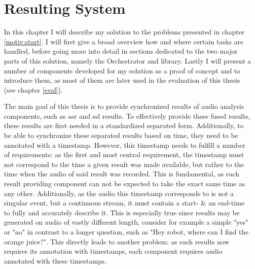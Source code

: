 \chapter{Resulting System}
\label{main:main}
In this chapter I will describe my solution to the problems presented in chapter \ref{motiv:start}.
I will first give a broad overview how and where certain tasks are handled, before going more into detail in sections dedicated to the two major parts of this solution, namely the Orchestrator and library.
Lastly I will present a number of components developed for my solution as a proof of concept and to introduce them, as most of them are later used in the evaluation of this thesis (see chapter \ref{eval}).

The main goal of this thesis is to provide synchronized results of audio analysis components, such as \gls{asr} and \gls{ssl} results.
To effectively provide these fused results, these results are first needed in a standardized separated form.
Additionally, to be able to synchronize these separated results based on time, they need to be annotated with a timestamp.
However, this timestamp needs to fulfill a number of requirements:
as the first and most central requirement, the timestamp must not correspond to the time a given result was made available, but rather to the time when the audio of said result was recorded.
This is fundamental, as each result providing component can not be expected to take the exact same time as any other.
Additionally, as the audio this timestamp corresponds to is not a singular event, but a continuous stream, it must contain a start- \& an end-time to fully and accurately describe it.
This is especially true since results may be generated on audio of vastly different length, consider for example a simple "yes" or "no" in contrast to a longer question, such as "Hey robot, where can I find the orange juice?".
This directly leads to another problem:
as each results now requires its annotation with timestamps, each component requires audio annotated with these timestamps.

